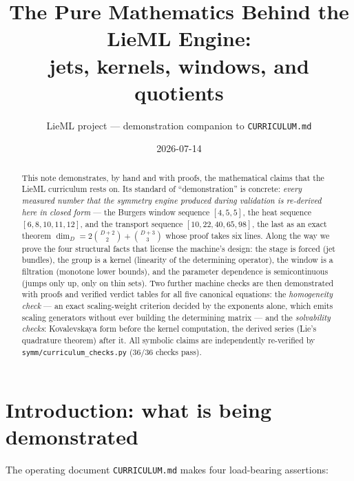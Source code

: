 \documentclass[11pt]{article}
\title{\bf The Pure Mathematics Behind the LieML Engine:\\
jets, kernels, windows, and quotients}
\author{LieML project --- demonstration companion to \texttt{CURRICULUM.md}}
\date{2026-07-14}
\theoremstyle{plain}
\theoremstyle{definition}
\theoremstyle{remark}
\begin{document}
\maketitle

\begin{abstract}
\noindent This note demonstrates, by hand and with proofs, the mathematical claims that the LieML
curriculum rests on. Its standard of ``demonstration'' is concrete: \emph{every measured number that
the symmetry engine produced during validation is re-derived here in closed form} --- the Burgers
window sequence $[4,5,5]$, the heat sequence $[6,8,10,11,12]$, and the transport sequence
$[10,22,40,65,98]$, the last as an exact theorem
$\dim_D=2\binom{D+2}{2}+\binom{D+3}{3}$ whose proof takes six lines. Along the way we prove the four
structural facts that license the machine's design: the stage is forced (jet bundles), the group is a
kernel (linearity of the determining operator), the window is a filtration (monotone lower bounds),
and the parameter dependence is semicontinuous (jumps only up, only on thin sets). Two further
machine checks are then demonstrated with proofs and verified verdict tables for all five canonical
equations: the \emph{homogeneity check} --- an exact scaling-weight criterion decided by the
exponents alone, which emits scaling generators without ever building the determining matrix ---
and the \emph{solvability checks}: Kovalevskaya form before the kernel computation, the derived
series (Lie's quadrature theorem) after it. All symbolic claims are independently re-verified by
\texttt{symm/curriculum\_checks.py} (36/36 checks pass).
\end{abstract}

\tableofcontents

\section{Introduction: what is being demonstrated}

The operating document \texttt{CURRICULUM.md} makes four load-bearing assertions:
\end{document}
